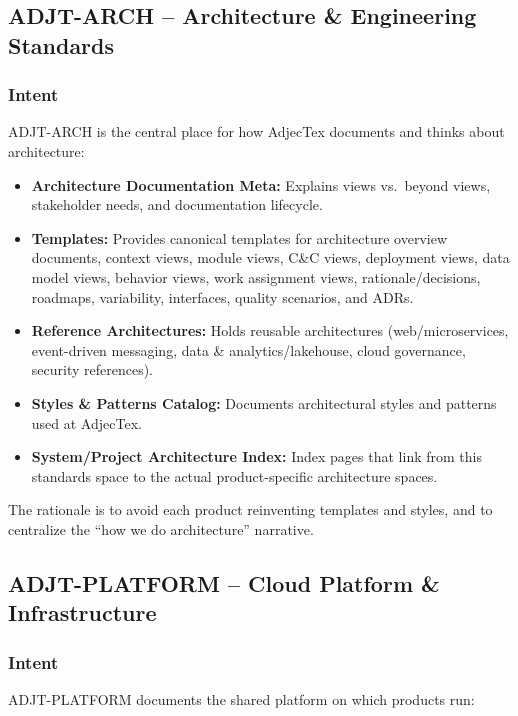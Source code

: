\documentclass[11pt]{article}
\begin{document}
\subsection{ADJT-ARCH -- Architecture \& Engineering Standards}

\subsubsection{Intent}

ADJT-ARCH is the central place for how AdjecTex documents and thinks
about architecture:

\begin{itemize}[leftmargin=*]
  \item \textbf{Architecture Documentation Meta:} Explains views vs.\
        beyond views, stakeholder needs, and documentation lifecycle.
  \item \textbf{Templates:} Provides canonical templates for
        architecture overview documents, context views, module views,
        C\&C views, deployment views, data model views, behavior views,
        work assignment views, rationale/decisions, roadmaps,
        variability, interfaces, quality scenarios, and ADRs.
  \item \textbf{Reference Architectures:} Holds reusable
        architectures (web/microservices, event-driven messaging, data
        \& analytics/lakehouse, cloud governance, security references).
  \item \textbf{Styles \& Patterns Catalog:} Documents architectural
        styles and patterns used at AdjecTex.
  \item \textbf{System/Project Architecture Index:} Index pages that
        link from this standards space to the actual product-specific
        architecture spaces.
\end{itemize}

The rationale is to avoid each product reinventing templates and
styles, and to centralize the ``how we do architecture'' narrative.

\subsection{ADJT-PLATFORM -- Cloud Platform \& Infrastructure}

\subsubsection{Intent}

ADJT-PLATFORM documents the shared platform on which products run:
\end{document}

